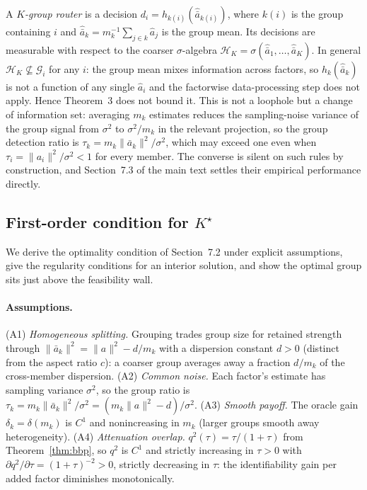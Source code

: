 \documentclass[12pt]{article}
\theoremstyle{plain}
\theoremstyle{definition}
\begin{document}
A \emph{$K$-group router} is a decision $d_i=h_{k(i)}(\hat{\bar a}_{k(i)})$, where
$k(i)$ is the group containing $i$ and $\hat{\bar a}_k=m_k^{-1}\sum_{j\in k}\hat
a_j$ is the group mean. Its decisions are measurable with respect to the coarser
$\sigma$-algebra $\mathcal H_K=\sigma(\hat{\bar a}_1,\dots,\hat{\bar a}_K)$. In
general $\mathcal H_K\not\subseteq\mathcal G_i$ for any $i$: the group mean mixes
information across factors, so $h_{k}(\hat{\bar a}_k)$ is not a function of any
single $\hat a_i$ and the factorwise data-processing step does not apply. Hence
Theorem~3 does not bound it. This is not a loophole but a change of information
set: averaging $m_k$ estimates reduces the sampling-noise variance of the group
signal from $\sigma^2$ to $\sigma^2/m_k$ in the relevant projection, so the group
detection ratio is $\tau_k=m_k\lVert\bar a_k\rVert^2/\sigma^2$, which may exceed
one even when $\tau_i=\lVert a_i\rVert^2/\sigma^2<1$ for every member. The
converse is silent on such rules by construction, and Section~7.3 of the main
text settles their empirical performance directly.
\subsection{First-order condition for $K^\star$}
\label{ia:foc}

We derive the optimality condition of Section~7.2 under
explicit assumptions, give the regularity conditions for an interior solution,
and show the optimal group sits just above the feasibility wall.

\paragraph{Assumptions.} (A1) \emph{Homogeneous splitting.} Grouping trades group
size for retained strength through $\lVert\bar a_k\rVert^2=\lVert a\rVert^2-d/m_k$
with a dispersion constant $d>0$ (distinct from the aspect ratio $c$): a coarser
group averages away a fraction $d/m_k$ of the cross-member dispersion. (A2)
\emph{Common noise.} Each factor's estimate has sampling variance $\sigma^2$, so
the group ratio is $\tau_k=m_k\lVert\bar a_k\rVert^2/\sigma^2
=(m_k\lVert a\rVert^2-d)/\sigma^2$. (A3) \emph{Smooth payoff.} The oracle gain
$\delta_k=\delta(m_k)$ is $C^1$ and nonincreasing in $m_k$ (larger groups smooth
away heterogeneity). (A4) \emph{Attenuation overlap.} $q^2(\tau)=\tau/(1+\tau)$
from Theorem~\ref{thm:bbp}, so $q^2$ is $C^1$ and strictly increasing in $\tau>0$
with $\partial q^2/\partial\tau=(1+\tau)^{-2}>0$, strictly decreasing in $\tau$:
the identifiability gain per added factor diminishes monotonically.
\end{document}
